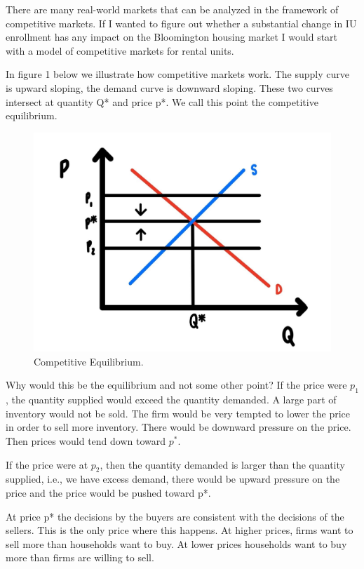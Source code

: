 \documentclass[
]{book}
\begin{document}
There are many real-world markets that can be analyzed in the framework of competitive markets. If I wanted to figure out whether a substantial change in IU enrollment has any impact on the Bloomington housing market I would start with a model of competitive markets for rental units.

In figure 1 below we illustrate how competitive markets work. The supply curve is upward sloping, the demand curve is downward sloping. These two curves intersect at quantity Q* and price p*. We call this point the competitive equilibrium.

\begin{figure}

{\centering \includegraphics[width=0.75\linewidth]{img/ch5/fig1} 

}

\caption{Competitive Equilibrium.}\label{fig:fig501}
\end{figure}

Why would this be the equilibrium and not some other point? If the price were \(p_1\), the quantity supplied would exceed the quantity demanded. A large part of inventory would not be sold. The firm would be very tempted to lower the price in order to sell more inventory. There would be downward pressure on the price. Then prices would tend down toward \(p^*\).

If the price were at \(p_2\), then the quantity demanded is larger than the quantity supplied, i.e., we have excess demand, there would be upward pressure on the price and the price would be pushed toward p*.

At price p* the decisions by the buyers are consistent with the decisions of the sellers. This is the only price where this happens. At higher prices, firms want to sell more than households want to buy. At lower prices households want to buy more than firms are willing to sell.
\end{document}
